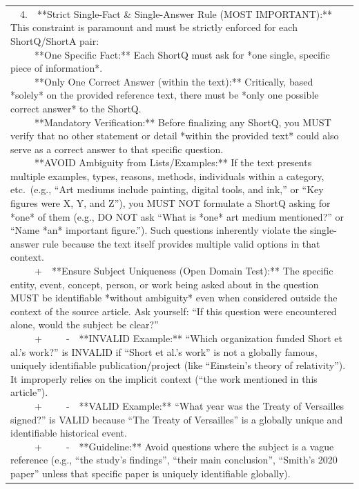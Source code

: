\documentclass[11pt]{article}
\begin{document}
\begin{table}[t]
\begin{tabular}{@{}p{\textwidth}@{}}
{\ \ 4.\ \ **Strict Single-Fact \& Single-Answer Rule (MOST IMPORTANT):** This constraint is paramount and must be strictly enforced for each ShortQ/ShortA pair:\\
\ \ \ \ \ **One Specific Fact:** Each ShortQ must ask for *one single, specific piece of information*.\\
\ \ \ \ \ **Only One Correct Answer (within the text):** Critically, based *solely* on the provided reference text, there must be *only one possible correct answer* to the ShortQ.\\
\ \ \ \ \ **Mandatory Verification:** Before finalizing any ShortQ, you MUST verify that no other statement or detail *within the provided text* could also serve as a correct answer to that specific question.\\
\ \ \ \ \ **AVOID Ambiguity from Lists/Examples:** If the text presents multiple examples, types, reasons, methods, individuals within a category, etc.\ (e.g., ``Art mediums include painting, digital tools, and ink,'' or ``Key figures were X, Y, and Z''), you MUST NOT formulate a ShortQ asking for *one* of them (e.g., DO NOT ask ``What is *one* art medium mentioned?'' or ``Name *an* important figure.''). Such questions inherently violate the single-answer rule because the text itself provides multiple valid options in that context.\\
\ \ \ \ \ +\ \ **Ensure Subject Uniqueness (Open Domain Test):** The specific entity, event, concept, person, or work being asked about in the question MUST be identifiable *without ambiguity* even when considered outside the context of the source article. Ask yourself: ``If this question were encountered alone, would the subject be clear?''\\
\ \ \ \ \ +\ \ \ \ \ -\ \ **INVALID Example:** ``Which organization funded Short et al.'s work?'' is INVALID if ``Short et al.'s work'' is not a globally famous, uniquely identifiable publication/project (like ``Einstein's theory of relativity''). It improperly relies on the implicit context (``the work mentioned in this article'').\\
\ \ \ \ \ +\ \ \ \ \ -\ \ **VALID Example:** ``What year was the Treaty of Versailles signed?'' is VALID because ``The Treaty of Versailles'' is a globally unique and identifiable historical event.\\
\ \ \ \ \ +\ \ \ \ \ -\ \ **Guideline:** Avoid questions where the subject is a vague reference (e.g., ``the study's findings'', ``their main conclusion'', ``Smith's 2020 paper'' unless that specific paper is uniquely identifiable globally).\\
}
\end{tabular}
\end{table}
\end{document}
